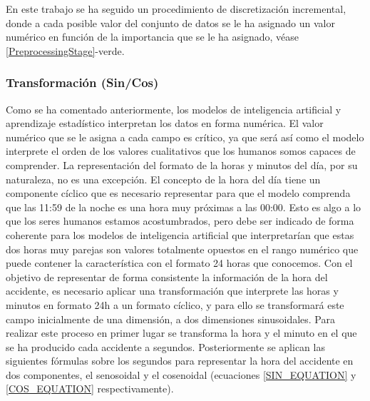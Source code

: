 
En este trabajo se ha seguido un procedimiento de discretización incremental, donde a cada posible valor del conjunto de datos se le ha asignado un valor numérico en función de la importancia que se le ha asignado, véase \ref{PreprocessingStage}-verde.



\subsubsection{Transformación (Sin/Cos)}


Como se ha comentado anteriormente, los modelos de inteligencia artificial y aprendizaje estadístico interpretan los datos en forma numérica. El valor numérico que se le asigna a cada campo es crítico, ya que será así como el modelo interprete el orden de los valores cualitativos que los humanos somos capaces de comprender. La representación del formato de la horas y minutos del día, por su naturaleza, no es una excepción. El concepto de la hora del día tiene un componente cíclico que es necesario representar para que el modelo comprenda que las 11:59 de la noche es una hora muy próximas a las 00:00. Esto es algo a lo que los seres humanos estamos acostumbrados, pero debe ser indicado de forma coherente para los modelos de inteligencia artificial que interpretarían que estas dos horas muy parejas son valores totalmente opuestos en el rango numérico que puede contener la característica con el formato 24 horas que conocemos. Con el objetivo de representar de forma consistente la información de la hora del accidente, es necesario aplicar una transformación que interprete las horas y minutos en formato 24h a un formato cíclico, y para ello se transformará este campo inicialmente de una dimensión, a dos dimensiones sinusoidales. Para realizar este proceso en primer lugar se transforma la hora y el minuto en el que se ha producido cada accidente a segundos. Posteriormente se aplican las siguientes fórmulas sobre los segundos para representar la hora del accidente en dos componentes, el senosoidal y el cosenoidal (ecuaciones \ref{SIN_EQUATION} y \ref{COS_EQUATION} respectivamente).


